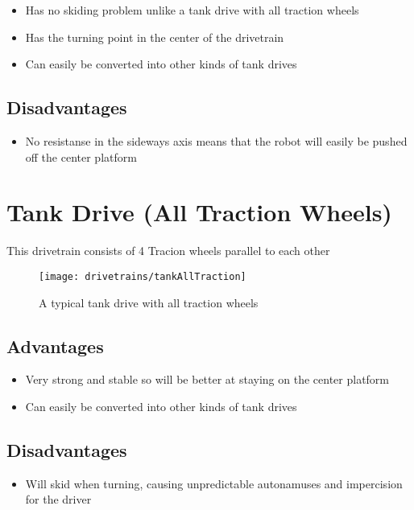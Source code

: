 \documentclass[../../main.tex]{subfiles}
\begin{document}
\begin{itemize}
	\item Has no skiding problem unlike a tank drive with all traction wheels
	\item Has the turning point in the center of the drivetrain
	\item Can easily be converted into other kinds of tank drives
\end{itemize}


\subsection{Disadvantages}

\begin{itemize}
	\item No resistanse in the sideways axis means that the robot will easily be
	      pushed off the center platform
\end{itemize}


\section{Tank Drive (All Traction Wheels)}

This drivetrain consists of 4 Tracion wheels parallel to each other

\begin{figure}[h]
	\centering
	\texttt{[image: drivetrains/tankAllTraction]}
	\caption{A typical tank drive with all traction wheels}
	\label{fig:drivetrainTankAllTraction}
\end{figure}

\subsection{Advantages}

\begin{itemize}
	\item Very strong and stable so will be better at staying on the center platform
	\item Can easily be converted into other kinds of tank drives
\end{itemize}


\subsection{Disadvantages}

\begin{itemize}
	\item Will skid when turning, causing unpredictable autonamuses and impercision for the driver
\end{itemize}
\end{document}
